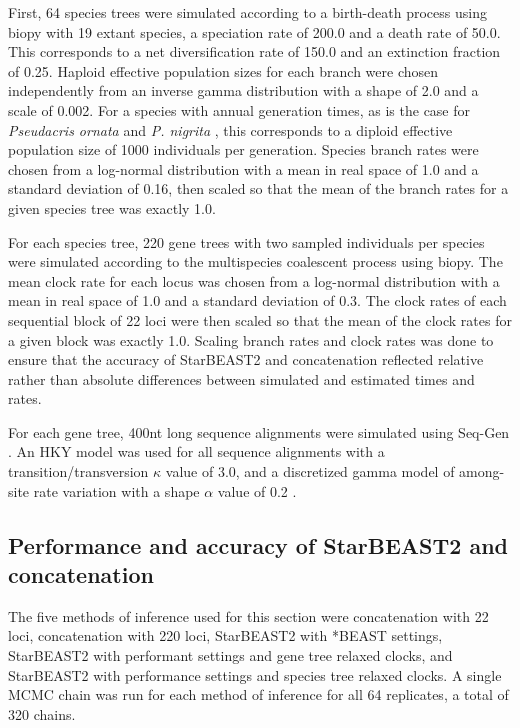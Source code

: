 \documentclass[12pt]{article}
\begin{document}
First, 64 species trees were simulated according to a birth-death process
\citep{Gernhard2008769} using biopy with 19 extant species, a speciation rate of
200.0 and a death rate of 50.0. This corresponds to a net diversification rate
of 150.0 and an extinction fraction of 0.25. Haploid effective population sizes
for each branch were chosen independently from an inverse gamma distribution
with a shape of 2.0 and a scale of 0.002. For a species with annual generation
times, as is the case for \textit{Pseudacris ornata} and \textit{P. nigrita}
\citep{10.2307/1446044}, this corresponds to a diploid effective population size
of 1000 individuals per generation. Species branch rates were chosen from a
log-normal distribution with a mean in real space of 1.0 and a standard
deviation of 0.16, then scaled so that the mean of the branch rates for a given
species tree was exactly 1.0.

For each species tree, 220 gene trees with two sampled individuals per species
were simulated according to the multispecies coalescent process using biopy. The
mean clock rate for each locus was chosen from a log-normal distribution with a
mean in real space of 1.0 and a standard deviation of 0.3. The clock rates of
each sequential block of 22 loci were then scaled so that the mean of the clock
rates for a given block was exactly 1.0. Scaling branch rates and clock rates
was done to ensure that the accuracy of StarBEAST2 and concatenation reflected
relative rather than absolute differences between simulated and estimated times
and rates.

For each gene tree, 400nt long sequence alignments were simulated using Seq-Gen
\citep{Rambaut01061997}. An HKY model was used for all sequence alignments with
a transition/transversion $\kappa$ value of 3.0, and a discretized gamma model
of among-site rate variation with a shape $\alpha$ value of 0.2
\citep{Yang1994}.

\subsection*{Performance and accuracy of StarBEAST2 and concatenation}

The five methods of inference used for this section were concatenation with 22
loci, concatenation with 220 loci, StarBEAST2 with *BEAST settings, StarBEAST2
with performant settings and gene tree relaxed clocks, and StarBEAST2 with
performance settings and species tree relaxed clocks. A single MCMC chain was
run for each method of inference for all 64 replicates, a total of 320 chains.
\end{document}
